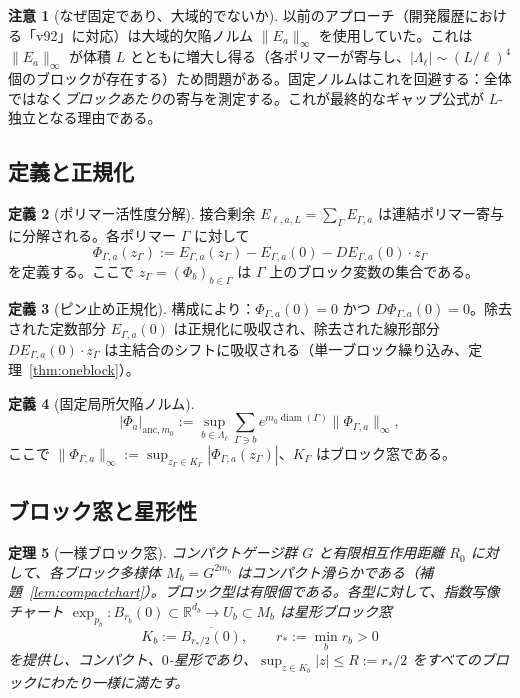 \documentclass[12pt]{article}
\theoremstyle{plain}
\newtheorem{theorem}{定理}[section]
\theoremstyle{definition}
\newtheorem{definition}[theorem]{定義}
\newtheorem{remark}[theorem]{注意}
\numberwithin{equation}{section}
\newcommand{\R}{\mathbb{R}}
\newcommand{\diam}{\operatorname{diam}}
\begin{document}
\begin{remark}[なぜ固定であり、大域的でないか]
以前のアプローチ（開発履歴における「v92」に対応）は大域的欠陥ノルム $\|E_a\|_\infty$ を使用していた。これは $\|E_a\|_\infty$ が体積 $L$ とともに増大し得る（各ポリマーが寄与し、$|\Lambda_\ell|\sim(L/\ell)^4$ 個のブロックが存在する）ため問題がある。固定ノルムはこれを回避する：全体ではなく\emph{ブロックあたり}の寄与を測定する。これが最終的なギャップ公式が $L$-独立となる理由である。
\end{remark}

\subsection{定義と正規化}

\begin{definition}[ポリマー活性度分解]
接合剰余 $E_{\ell,a,L}=\sum_\Gamma E_{\Gamma,a}$ は連結ポリマー寄与に分解される。各ポリマー $\Gamma$ に対して
\begin{equation}
\Phi_{\Gamma,a}(z_\Gamma) := E_{\Gamma,a}(z_\Gamma) - E_{\Gamma,a}(0) - DE_{\Gamma,a}(0)\cdot z_\Gamma
\end{equation}
を定義する。ここで $z_\Gamma=(\Phi_b)_{b\in\Gamma}$ は $\Gamma$ 上のブロック変数の集合である。
\end{definition}

\begin{definition}[ピン止め正規化]
構成により：$\Phi_{\Gamma,a}(0)=0$ かつ $D\Phi_{\Gamma,a}(0)=0$。除去された定数部分 $E_{\Gamma,a}(0)$ は正規化に吸収され、除去された線形部分 $DE_{\Gamma,a}(0)\cdot z_\Gamma$ は主結合のシフトに吸収される（単一ブロック繰り込み、定理~\ref{thm:oneblock}）。
\end{definition}

\begin{definition}[固定局所欠陥ノルム]
\begin{equation}
|\Phi_a|_{\mathrm{anc},m_0} := \sup_{b\in\Lambda_\ell}\sum_{\Gamma\ni b}e^{m_0\diam(\Gamma)}\|\Phi_{\Gamma,a}\|_\infty,
\end{equation}
ここで $\|\Phi_{\Gamma,a}\|_\infty:=\sup_{z_\Gamma\in K_\Gamma}|\Phi_{\Gamma,a}(z_\Gamma)|$、$K_\Gamma$ はブロック窓である。
\end{definition}

\subsection{ブロック窓と星形性}

\begin{theorem}[一様ブロック窓]\label{thm:blockwindow}
コンパクトゲージ群 $G$ と有限相互作用距離 $R_0$ に対して、各ブロック多様体 $M_b=G^{2m_b}$ はコンパクト滑らかである（補題~\ref{lem:compactchart}）。ブロック型は有限個である。各型に対して、指数写像チャート $\exp_{p_b}:B_{r_b}(0)\subset\R^{d_b}\to U_b\subset M_b$ は星形ブロック窓
\begin{equation}
K_b := \overline{B_{r_*/2}(0)},\qquad r_*:=\min_b r_b>0
\end{equation}
を提供し、コンパクト、$0$-星形であり、$\sup_{z\in K_b}|z|\leq R:=r_*/2$ をすべてのブロックにわたり一様に満たす。
\end{theorem}
\end{document}
